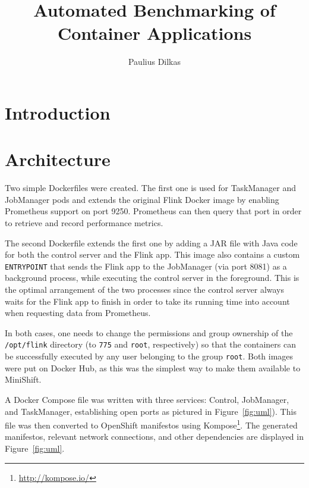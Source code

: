 \documentclass{article}
\title{Automated Benchmarking of Container Applications}
\author{Paulius Dilkas}
\begin{document}
\maketitle


\section{Introduction}


\section{Architecture}

Two simple Dockerfiles were created. The first one is used for TaskManager and
JobManager pods and extends the original Flink Docker image by enabling
Prometheus support on port 9250. Prometheus can then query that port in order to
retrieve and record performance metrics.

The second Dockerfile extends the first one by adding a JAR file with Java code
for both the control server and the Flink app. This image also contains a custom
\texttt{ENTRYPOINT} that sends the Flink app to the JobManager (via port 8081)
as a background process, while executing the control server in the foreground.
This is the optimal arrangement of the two processes since the control server
always waits for the Flink app to finish in order to take its running time into
account when requesting data from Prometheus.

In both cases, one needs to change the permissions and group ownership of the
\texttt{/opt/flink} directory (to \texttt{775} and \texttt{root}, respectively)
so that the containers can be successfully executed by any user belonging to the
group \texttt{root}. Both images were put on Docker Hub, as this was the
simplest way to make them available to MiniShift.

A Docker Compose file was written with three services: Control,
JobManager, and TaskManager, establishing open ports as pictured in
Figure~\ref{fig:uml}). This file was then converted to OpenShift manifestos
using Kompose\footnote{\url{http://kompose.io/}}. The generated manifestos,
relevant network connections, and other dependencies are displayed in
Figure~\ref{fig:uml}.
\end{document}
